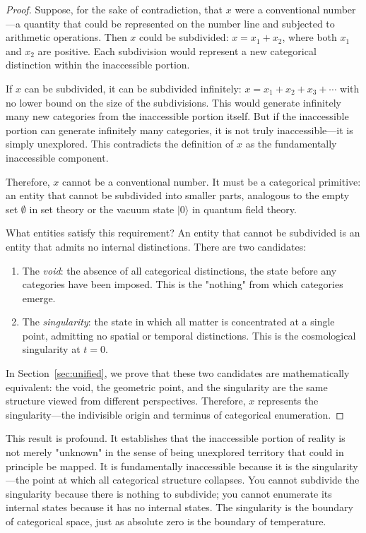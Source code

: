 \documentclass[12pt,a4paper]{article}
\theoremstyle{definition}
\theoremstyle{remark}
\begin{document}
\begin{proof}
Suppose, for the sake of contradiction, that $x$ were a conventional number—a quantity that could be represented on the number line and subjected to arithmetic operations. Then $x$ could be subdivided: $x = x_1 + x_2$, where both $x_1$ and $x_2$ are positive. Each subdivision would represent a new categorical distinction within the inaccessible portion.

If $x$ can be subdivided, it can be subdivided infinitely: $x = x_1 + x_2 + x_3 + \cdots$ with no lower bound on the size of the subdivisions. This would generate infinitely many new categories from the inaccessible portion itself. But if the inaccessible portion can generate infinitely many categories, it is not truly inaccessible—it is simply unexplored. This contradicts the definition of $x$ as the fundamentally inaccessible component.

Therefore, $x$ cannot be a conventional number. It must be a categorical primitive: an entity that cannot be subdivided into smaller parts, analogous to the empty set $\emptyset$ in set theory or the vacuum state $|0\rangle$ in quantum field theory.

What entities satisfy this requirement? An entity that cannot be subdivided is an entity that admits no internal distinctions. There are two candidates:
\begin{enumerate}
    \item The \emph{void}: the absence of all categorical distinctions, the state before any categories have been imposed. This is the "nothing" from which categories emerge.
    \item The \emph{singularity}: the state in which all matter is concentrated at a single point, admitting no spatial or temporal distinctions. This is the cosmological singularity at $t = 0$.
\end{enumerate}

In Section~\ref{sec:unified}, we prove that these two candidates are mathematically equivalent: the void, the geometric point, and the singularity are the same structure viewed from different perspectives. Therefore, $x$ represents the singularity—the indivisible origin and terminus of categorical enumeration.
\end{proof}

This result is profound. It establishes that the inaccessible portion of reality is not merely "unknown" in the sense of being unexplored territory that could in principle be mapped. It is fundamentally inaccessible because it is the singularity—the point at which all categorical structure collapses. You cannot subdivide the singularity because there is nothing to subdivide; you cannot enumerate its internal states because it has no internal states. The singularity is the boundary of categorical space, just as absolute zero is the boundary of temperature.
\end{document}

